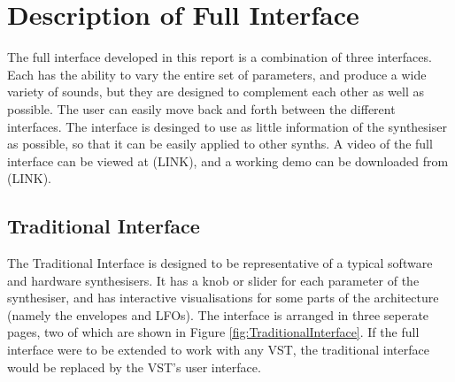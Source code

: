 \documentclass[11pt, oneside]{report}   	%
\begin{document}
\chapter{Description of Full Interface}
The full interface developed in this report is a combination of three interfaces. Each has the ability to vary the entire set of parameters, and produce a wide variety of sounds, but they are designed to complement each other as well as possible. The user can easily move back and forth between the different interfaces. The interface is desinged to use as little information of the synthesiser as possible, so that it can be easily applied to other synths. A video of the full interface can be viewed at (LINK), and a working demo can be downloaded from (LINK).
\vspace{-15pt}
\section{Traditional Interface}
The Traditional Interface is designed to be representative of a typical software and hardware synthesisers. It has a knob or slider for each parameter of the synthesiser, and has interactive visualisations for some parts of the architecture (namely the envelopes and LFOs). The interface is arranged in three seperate pages, two of which are shown in Figure \ref{fig:TraditionalInterface}. 
If the full interface were to be extended to work with any VST, the traditional interface would be replaced by the VST's user interface. 
\end{document}
